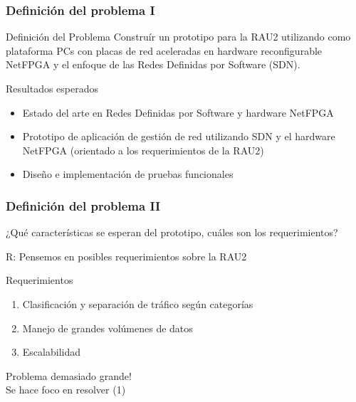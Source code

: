\documentclass{beamer}
\begin{document}
\begin{frame}
\frametitle{Definición del problema I} 

\begin{block}{Definición del Problema }
Constru\'ir un prototipo para la RAU2 utilizando como plataforma PCs con placas de red aceleradas en hardware reconfigurable NetFPGA y el enfoque de las Redes Definidas por Software (SDN).
\end{block}

\pause
\begin{block}{Resultados esperados}
\begin{itemize}
\item Estado del arte en Redes Definidas por Software y hardware NetFPGA
\pause
\item Prototipo de aplicaci\'on de gesti\'on de red utilizando SDN y el hardware NetFPGA (orientado a  los requerimientos de la RAU2)
\pause
\item Diseño e implementaci\'on de pruebas funcionales
\end{itemize}
\end{block}

\end{frame}

\begin{frame}
\frametitle{Definición del problema II} 

¿Qu\'e características se esperan del prototipo, cu\'ales son los requerimientos?

\pause
{\color{blue}R: Pensemos en posibles requerimientos sobre la RAU2}

\pause
\begin{block}{Requerimientos}
\begin{enumerate}[<+->]
\item Clasificaci\'on y separaci\'on de tr\'afico seg\'un categorías
\item Manejo de grandes vol\'umenes de datos
\item Escalabilidad
\end{enumerate}
\end{block}

\pause
Problema demasiado grande!\\
\pause
{\color{blue} Se hace foco en resolver (1)}

\end{frame}

\end{document}
